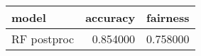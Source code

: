 \begin{tabular}{lrr}
\toprule
model & accuracy & fairness \\
\midrule
RF postproc & 0.854000 & 0.758000 \\
\bottomrule
\end{tabular}
